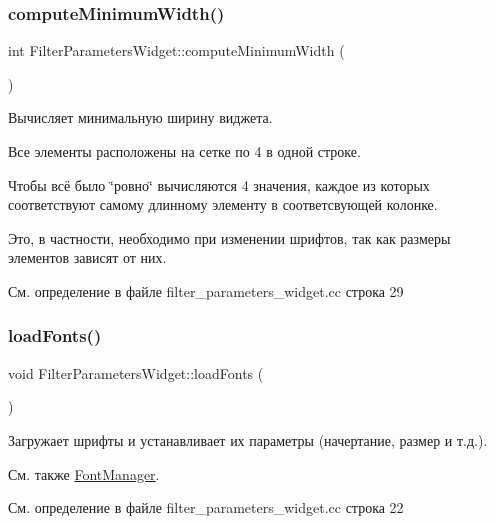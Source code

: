 \subsubsection{\texorpdfstring{compute\+Minimum\+Width()}{computeMinimumWidth()}}
{\footnotesize\ttfamily int Filter\+Parameters\+Widget\+::compute\+Minimum\+Width (\begin{DoxyParamCaption}{ }\end{DoxyParamCaption})\hspace{0.3cm}{\ttfamily [private]}}



Вычисляет минимальную ширину виджета. 

Все элементы расположены на сетке по 4 в одной строке.

Чтобы всё было \char`\"{}ровно\char`\"{} вычисляются 4 значения, каждое из которых соответствуют самому длинному элементу в соответсвующей колонке.

Это, в частности, необходимо при изменении шрифтов, так как размеры элементов зависят от них. 

См. определение в файле filter\+\_\+parameters\+\_\+widget.\+cc строка 29

\hypertarget{class_filter_parameters_widget_aeadea883731fe8ef61b3577319578e02}{}\label{class_filter_parameters_widget_aeadea883731fe8ef61b3577319578e02} 
\subsubsection{\texorpdfstring{load\+Fonts()}{loadFonts()}}
{\footnotesize\ttfamily void Filter\+Parameters\+Widget\+::load\+Fonts (\begin{DoxyParamCaption}{ }\end{DoxyParamCaption})\hspace{0.3cm}{\ttfamily [private]}}



Загружает шрифты и устанавливает их параметры (начертание, размер и т.\+д.). 

\begin{DoxySeeAlso}{См. также}
\hyperlink{class_font_manager}{Font\+Manager}. 
\end{DoxySeeAlso}


См. определение в файле filter\+\_\+parameters\+\_\+widget.\+cc строка 22

